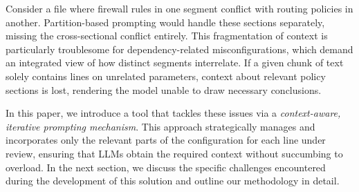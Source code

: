 Consider a file where firewall rules in one segment conflict with routing policies
in another. Partition-based prompting would handle these sections separately, missing
the cross-sectional conflict entirely. This fragmentation of context is particularly
troublesome for dependency-related misconfigurations, which demand an integrated view
of how distinct segments interrelate. If a given chunk of text solely contains lines
on unrelated parameters, context about relevant policy sections is lost, rendering
the model unable to draw necessary conclusions.

In this paper, we introduce a tool that tackles these issues via a \emph{context-aware,
	iterative prompting mechanism}. This approach strategically manages and incorporates
only the relevant parts of the configuration for each line under review, ensuring that
LLMs obtain the required context without succumbing to overload. In the next section,
we discuss the specific challenges encountered during the development of this solution
and outline our methodology in detail.

